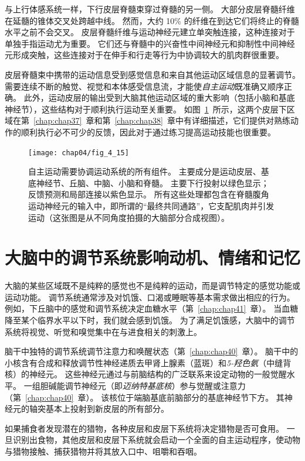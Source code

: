 与上行体感系统一样，下行皮层脊髓束穿过脊髓的另一侧。 
大部分皮层脊髓纤维在延髓的锥体交叉处跨越中线。
然而，大约 10\% 的纤维在到达它们将终止的脊髓水平之前不会交叉。 
皮层脊髓纤维与运动神经元建立单突触连接，这种连接对于单独手指运动尤为重要。 
它们还与脊髓中的兴奋性中间神经元和抑制性中间神经元形成突触，这些连接对于在伸手和行走等行为中协调较大的肌肉群很重要。


皮层脊髓束中携带的运动信息受到感觉信息和来自其他运动区域信息的显著调节。
需要连续不断的触觉、视觉和本体感受信息流，才能使\textit{自主运动}既准确又顺序正确。
此外，运动皮层的输出受到大脑其他运动区域的重大影响（包括小脑和基底神经节），这些结构对于顺利执行运动至关重要。
如图~\ref{fig:4_15}~所示，这两个皮层下区域在第~\ref{chap:chap37}~章和第~\ref{chap:chap38}~章中有详细描述，它们提供对熟练动作的顺利执行必不可少的反馈，因此对于通过练习提高运动技能也很重要。

\begin{figure}[htbp]
	\centering
	\texttt{[image: chap04/fig\_4\_15]}
	\caption{自主运动需要协调运动系统的所有组件。
		主要成分是运动皮层、基底神经节、丘脑、中脑、小脑和脊髓。
		主要下行投射以绿色显示；
		反馈预测和局部连接以紫色显示。
		所有这些处理都包含在脊髓腹角运动神经元的输入中，即所谓的“最终共同通路”，它支配肌肉并引发运动（这张图是从不同角度拍摄的大脑部分合成视图）。}
	\label{fig:4_15}
\end{figure}



\section{大脑中的调节系统影响动机、情绪和记忆}

大脑的某些区域既不是纯粹的感觉也不是纯粹的运动，而是调节特定的感觉功能或运动功能。
调节系统通常涉及对饥饿、口渴或睡眠等基本需求做出相应的行为。
例如，下丘脑中的感觉和调节系统决定血糖水平（第~\ref{chap:chap41}~章）。
当血糖降至某个临界水平以下时，我们就会感到饥饿。
为了满足饥饿感，大脑中的调节系统将视觉、听觉和嗅觉集中在与进食相关的刺激上。


脑干中独特的调节系统调节注意力和唤醒状态（第~\ref{chap:chap40}~章）。 
脑干中的小核含有合成和释放调节性神经递质去甲肾上腺素（蓝斑）和\textit{5-羟色氨}（中缝背核）的神经元。 
这些神经元通过与前脑结构的广泛联系来设定动物的一般觉醒水平。 
一组胆碱能调节神经元（即\textit{迈纳特基底核}）参与觉醒或注意力（第~\ref{chap:chap40}~章）。
该核位于端脑基底前脑部分的基底神经节下方。 
其神经元的轴突基本上投射到新皮层的所有部分。


如果捕食者发现潜在的猎物，各种皮层和皮层下系统将决定猎物是否可食用。 
一旦识别出食物，其他皮层和皮层下系统就会启动一个全面的自主运动程序，使动物与猎物接触、捕获猎物并将其放入口中、咀嚼和吞咽。


